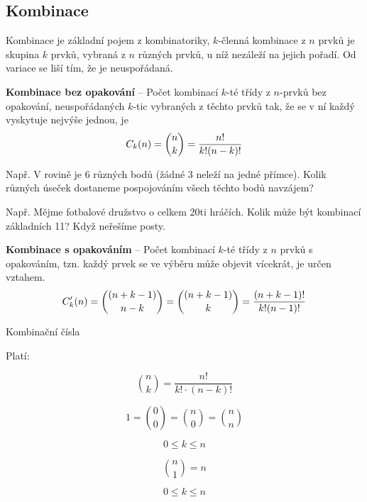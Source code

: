 \subsection{Kombinace}

\begin{compactitem}
    \item Kombinace je základní pojem z kombinatoriky, $k$-členná kombinace z $n$ prvků je skupina $k$ prvků, vybraná z $n$ různých prvků, u níž nezáleží na jejich pořadí. Od variace se liší tím, že je neuspořádaná.

    \item \textbf{Kombinace bez opakování} -- Počet kombinací $k$-té třídy z $n$-prvků bez opakování, neuspořádaných $k$-tic vybraných z těchto prvků tak, že se v ní každý vyskytuje nejvýše jednou, je
    $$ {\displaystyle C_{k}(n)={n \choose k}={n! \over k!(n-k)!}} $$ \begin{compactitem}
        \item Např. V rovině je 6 různých bodů (žádné 3 neleží na jedné přímce). Kolik různých úseček dostaneme pospojováním všech těchto bodů navzájem?
        \item Např. Mějme fotbalové družstvo o celkem 20ti hráčích. Kolik může být kombinací základních 11? Když neřešíme posty.
    \end{compactitem}

    \item \textbf{Kombinace s opakováním} -- Počet kombinací $k$-té třídy z $n$ prvků s opakováním, tzn. každý prvek se ve výběru může objevit vícekrát, je určen vztahem.
    $$ {\displaystyle C_{k}^{\prime }(n)={{(n+k-1)} \choose n-k}={{(n+k-1)} \choose k}={(n+k-1)! \over k!(n-1)!}}$$

    \item Kombinační čísla \begin{compactitem}
        \item Platí:

        \begin{equation}
            {n \choose k} = \frac{n!}{k! \cdot (n-k)!}
        \end{equation}

        \begin{equation}
            1 = {0 \choose 0} = {n \choose 0} = {n \choose n}
        \end{equation}

        \begin{equation}
            0 \leq k \leq n
        \end{equation}

        \begin{equation}
            {n \choose 1} = n
        \end{equation}

        \begin{equation}
            0 \leq k \leq n
        \end{equation}
    \end{compactitem}
\end{compactitem}

